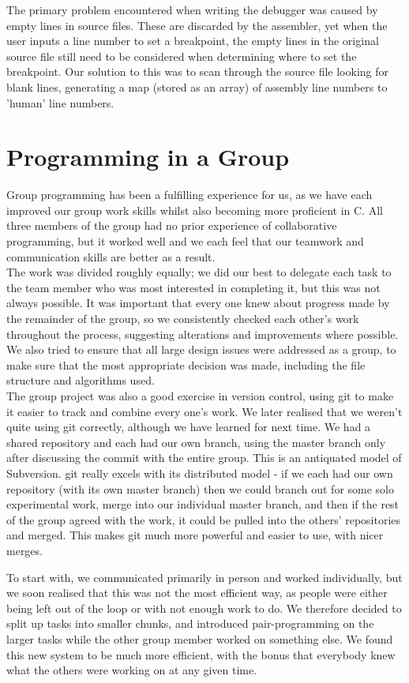 \documentclass[11pt]{report}
\begin{document}
The primary problem encountered when writing the debugger was caused by empty
lines in source files. These are discarded by the assembler, yet when the user
inputs a line number to set a breakpoint, the empty lines in the original source
file still need to be considered when determining where to set the breakpoint.
Our solution to this was to scan through the source file looking for blank lines,
generating a map (stored as an array) of assembly line numbers to 'human' line
numbers.

\section*{Programming in a Group}

Group programming has been a fulfilling experience for us, as we have each
improved our group work skills whilst also becoming more proficient in C. All
three members of the group had no prior experience of collaborative programming,
but it worked well and we each feel that our teamwork and communication skills
are better as a result.
\\[2ex]
The work was divided roughly equally; we did our best to delegate each task to the team
member who was most interested in completing it, but this was not always possible. It 
was important that every one knew about progress made by the remainder of the group, so we
consistently checked each other's work throughout the process, suggesting
alterations and improvements where possible. We also tried to ensure that all large design
issues were addressed as a group, to make sure that the most appropriate decision was
made, including the file structure and algorithms used.
\\[2ex]
The group project was also a good exercise in version control, using git to make
it easier to track and combine every one's work. We later realised that we
weren't quite using git correctly, although we have learned for next time. We
had a shared repository and each had our own branch, using the master branch
only after discussing the commit with the entire group. This is an antiquated
model of Subversion. git really excels with its distributed model - if we each
had our own repository (with its own master branch) then we could branch out for
some solo experimental work, merge into our individual master branch, and then
if the rest of the group agreed with the work, it could be pulled into the others' repositories 
and merged. This makes git much more powerful and easier to use, with nicer merges.

\newpage

To start with, we communicated primarily in person and worked individually, but
we soon realised that this was not the most efficient way, as people were either
being left out of the loop or with not enough work to do. We therefore decided to
split up tasks into smaller chunks, and introduced pair-programming on the larger
tasks while the other group member worked on something else. We found this new
system to be much more efficient, with the bonus that everybody knew what the
others were working on at any given time.
\end{document}
